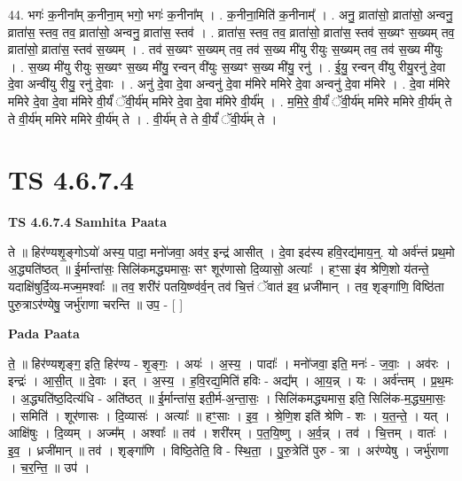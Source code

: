 \documentclass[17pt]{extarticle}
\begin{document}
44. भगः॑ क॒नीना᳚म् क॒नीना॒म् भगो॒ भगः॑ क॒नीना᳚म् । . क॒नीना॒मिति॑ क॒नीनाम्᳚ । . अनु॒ व्राता॑सो॒ व्राता॑सो॒ अन्वनु॒ व्राता॑स॒ स्तव॒ तव॒ व्राता॑सो॒ अन्वनु॒ व्राता॑स॒ स्तव॑ । . व्राता॑स॒ स्तव॒ तव॒ व्राता॑सो॒ व्राता॑स॒ स्तव॑ स॒ख्यꣳ स॒ख्यम् तव॒ व्राता॑सो॒ व्राता॑स॒ स्तव॑ स॒ख्यम् । . तव॑ स॒ख्यꣳ स॒ख्यम् तव॒ तव॑ स॒ख्य मी॑यु रीयुः स॒ख्यम् तव॒ तव॑ स॒ख्य मी॑युः । . स॒ख्य मी॑यु रीयुः स॒ख्यꣳ स॒ख्य मी॑यु॒ रन्वन् वी॑युः स॒ख्यꣳ स॒ख्य मी॑यु॒ रनु॑ । . ई॒यु॒ रन्वन् वी॑यु रीयु॒रनु॑ दे॒वा दे॒वा अन्वी॑यु रीयु॒ रनु॑ दे॒वाः । . अनु॑ दे॒वा दे॒वा अन्वनु॑ दे॒वा म॑मिरे ममिरे दे॒वा अन्वनु॑ दे॒वा म॑मिरे । . दे॒वा म॑मिरे ममिरे दे॒वा दे॒वा म॑मिरे वी॒र्यं॑ ॅवी॒र्य॑म् ममिरे दे॒वा दे॒वा म॑मिरे वी॒र्य᳚म् । . म॒मि॒रे॒ वी॒र्यं॑ ॅवी॒र्य॑म् ममिरे ममिरे वी॒र्य॑म् ते ते वी॒र्य॑म् ममिरे ममिरे वी॒र्य॑म् ते । . वी॒र्य॑म् ते ते वी॒र्यं॑ ॅवी॒र्य॑म् ते । \newline
\pagebreak
{}

\section{ TS 4.6.7.4 }

\textbf{TS 4.6.7.4 } \newline
\textbf{Samhita Paata} \newline

ते ॥ हिर॑ण्यशृ॒ङ्गोऽयो॑ अस्य॒ पादा॒ मनो॑जवा॒ अव॑र॒ इन्द्र॑ आसीत् । दे॒वा इद॑स्य हवि॒रद्य॑माय॒न्॒. यो अर्व॑न्तं प्रथ॒मो अ॒द्ध्यति॑ष्ठत् ॥ ई॒र्मान्ता॑सः॒ सिलि॑कमद्ध्यमासः॒ सꣳ शूर॑णासो दि॒व्यासो॒ अत्याः᳚ । हꣳ॒॒सा इ॑व श्रेणि॒शो य॑तन्ते॒ यदाक्षि॑षुर्दि॒व्य-मज्म॒मश्वाः᳚ ॥ तव॒ शरी॑रं पतयि॒ष्ण्व॑र्व॒न् तव॑ चि॒त्तं ॅवात॑ इव॒ ध्रजी॑मान् । तव॒ शृङ्गा॑णि॒ विष्ठि॑ता पुरु॒त्राऽर॑ण्येषु॒ जर्भु॑राणा चरन्ति ॥ उप॒ - [  ] \newline

\textbf{Pada Paata} \newline

ते॒ ॥ हिर॑ण्यशृङ्ग॒ इति॒ हिर॑ण्य - शृ॒ङ्गः॒ । अयः॑ । अ॒स्य॒ । पादाः᳚ । मनो॑जवा॒ इति॒ मनः॑ - ज॒वाः॒ । अव॑रः । इन्द्रः॑ । आ॒सी॒त् ॥ दे॒वाः । इत् । अ॒स्य॒ । ह॒वि॒रद्य॒मिति॑ हविः - अद्य᳚म् । आ॒य॒न्न् । यः । अर्व॑न्तम् । प्र॒थ॒मः । अ॒द्ध्यति॑ष्ठ॒दित्य॑धि - अति॑ष्ठत् ॥ ई॒र्मान्ता॑स॒ इती॒र्म-अ॒न्ता॒सः॒ । सिलि॑कमद्ध्यमास॒ इति॒ सिलि॑क-म॒द्ध्य॒मा॒सः॒ । समिति॑ । शूर॑णासः । दि॒व्यासः॑ । अत्याः᳚ ॥ हꣳ॒॒साः । इ॒व॒ । श्रे॒णि॒श इति॑ श्रेणि - शः । य॒त॒न्ते॒ । यत् । आक्षि॑षुः । दि॒व्यम् । अज्म᳚म् । अश्वाः᳚ ॥ तव॑ । शरी॑रम् । प॒त॒यि॒ष्णु । अ॒र्व॒न्न् । तव॑ । चि॒त्तम् । वातः॑ । इ॒व॒ । ध्रजी॑मान् ॥ तव॑ । शृङ्गा॑णि । विष्ठि॒तेति॒ वि - स्थि॒ता॒ । पु॒रु॒त्रेति॑ पुरु - त्रा । अर॑ण्येषु । जर्भु॑राणा । च॒र॒न्ति॒ ॥ उप॑ ।  \newline
\end{document}
